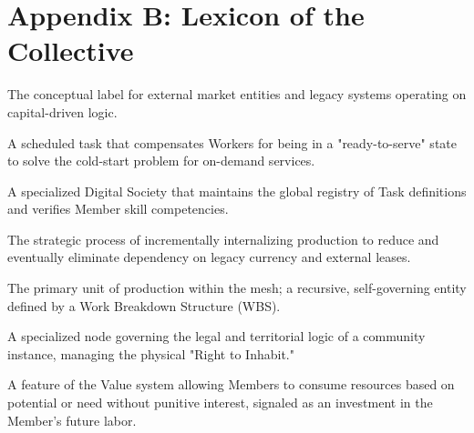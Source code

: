 \section*{Appendix B: Lexicon of the Collective}

\begin{description}[style=nextline, leftmargin=1em, font=\bfseries\headerfont\color{collectiveBlue}]
    \item[Aliens] The conceptual label for external market entities and legacy systems operating on capital-driven logic.
    \item[Availability Task] A scheduled task that compensates Workers for being in a "ready-to-serve" state to solve the cold-start problem for on-demand services.
    \item[Body of Knowledge (BoK)] A specialized Digital Society that maintains the global registry of Task definitions and verifies Member skill competencies.
    \item[Leaching] The strategic process of incrementally internalizing production to reduce and eventually eliminate dependency on legacy currency and external leases.
    \item[Service Node] The primary unit of production within the mesh; a recursive, self-governing entity defined by a Work Breakdown Structure (WBS).
    \item[Society] A specialized node governing the legal and territorial logic of a community instance, managing the physical "Right to Inhabit."
    \item[Unbounded Negative Balance] A feature of the Value system allowing Members to consume resources based on potential or need without punitive interest, signaled as an investment in the Member’s future labor.
\end{description}

